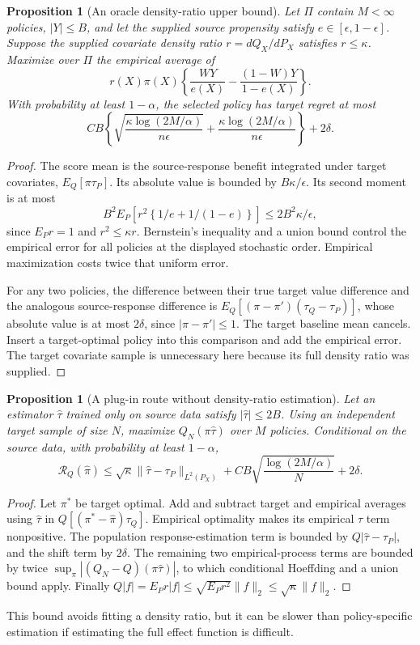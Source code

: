 \documentclass[11pt]{article}
\newtheorem{proposition}[theorem]{Proposition}
\theoremstyle{remark}
\begin{document}
\begin{proposition}[An oracle density-ratio upper bound]
Let $\Pi$ contain $M<\infty$ policies, $|Y|\le B$, and let the supplied source propensity satisfy $e\in[\epsilon,1-\epsilon]$. Suppose the supplied covariate density ratio $r=dQ_X/dP_X$ satisfies $r\le\kappa$. Maximize over $\Pi$ the empirical average of
\[
 r(X)\pi(X)\left\{\frac{WY}{e(X)}-
 \frac{(1-W)Y}{1-e(X)}\right\}.
\]
With probability at least $1-\alpha$, the selected policy has target regret at most
\[
 C B\left\{\sqrt{\frac{\kappa\log(2M/\alpha)}{n\epsilon}}+
 \frac{\kappa\log(2M/\alpha)}{n\epsilon}\right\}+2\delta.
\]
\end{proposition}
\begin{proof}
The score mean is the source-response benefit integrated under target covariates, $E_Q[\pi\tau_P]$. Its absolute value is bounded by $B\kappa/\epsilon$. Its second moment is at most
\[
 B^2E_P\left[r^2\left\{1/e+1/(1-e)\right\}\right]
 \le 2B^2\kappa/\epsilon,
\]
since $E_Pr=1$ and $r^2\le\kappa r$. Bernstein's inequality and a union bound control the empirical error for all policies at the displayed stochastic order. Empirical maximization costs twice that uniform error.

For any two policies, the difference between their true target value difference and the analogous source-response difference is
$E_Q[(\pi-\pi')(\tau_Q-\tau_P)]$, whose absolute value is at most $2\delta$, since $|\pi-\pi'|\le1$. The target baseline mean cancels. Insert a target-optimal policy into this comparison and add the empirical error. The target covariate sample is unnecessary here because its full density ratio was supplied.
\end{proof}

\begin{proposition}[A plug-in route without density-ratio estimation]
Let an estimator $\widehat\tau$ trained only on source data satisfy $|\widehat\tau|\le2B$. Using an independent target sample of size $N$, maximize $Q_N(\pi\widehat\tau)$ over $M$ policies. Conditional on the source data, with probability at least $1-\alpha$,
\[
 \mathcal R_Q(\widehat\pi)\le
 \sqrt\kappa\|\widehat\tau-\tau_P\|_{L^2(P_X)}
 +C B\sqrt{\frac{\log(2M/\alpha)}N}+2\delta.
\]
\end{proposition}
\begin{proof}
Let $\pi^*$ be target optimal. Add and subtract target and empirical averages using $\widehat\tau$ in
$Q[(\pi^*-\widehat\pi)\tau_Q]$. Empirical optimality makes its empirical $\widehat\tau$ term nonpositive. The population response-estimation term is bounded by $Q|\widehat\tau-\tau_P|$, and the shift term by $2\delta$. The remaining two empirical-process terms are bounded by twice $\sup_\pi|(Q_N-Q)(\pi\widehat\tau)|$, to which conditional Hoeffding and a union bound apply. Finally
$Q|f|=E_Pr|f|\le\sqrt{E_Pr^2}\|f\|_2\le\sqrt\kappa\|f\|_2$.
\end{proof}
This bound avoids fitting a density ratio, but it can be slower than policy-specific estimation if estimating the full effect function is difficult.
\end{document}
